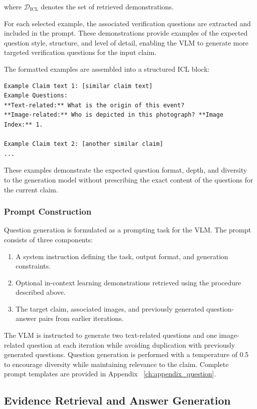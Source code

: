 where $\mathcal{D}_{\text{ICL}}$ denotes the set of retrieved demonstrations.

For each selected example, the associated verification questions are extracted and included in the prompt. These demonstrations provide examples of the expected question style, structure, and level of detail, enabling the VLM to generate more targeted verification questions for the input claim.


The formatted examples are assembled into a structured ICL block:

\begin{verbatim}
Example Claim text 1: [similar claim text]
Example Questions:
**Text-related:** What is the origin of this event?
**Image-related:** Who is depicted in this photograph? **Image Index:** 1.

Example Claim text 2: [another similar claim]
...
\end{verbatim}

These examples demonstrate the expected question format, depth, and diversity to the generation model without prescribing the exact content of the questions for the current claim.

\subsubsection{Prompt Construction}

Question generation is formulated as a prompting task for the VLM. The prompt consists of three components:

\begin{enumerate}
\item A system instruction defining the task, output format, and generation constraints.
\item Optional in-context learning demonstrations retrieved using the procedure described above.
\item The target claim, associated images, and previously generated question-answer pairs from earlier iterations.
\end{enumerate}

The VLM is instructed to generate two text-related questions and one image-related question at each iteration while avoiding duplication with previously generated questions. Question generation is performed with a temperature of 0.5 to encourage diversity while maintaining relevance to the claim. Complete prompt templates are provided in Appendix ~\ref{ch:appendix_question}.

\subsection{Evidence Retrieval and Answer Generation}

